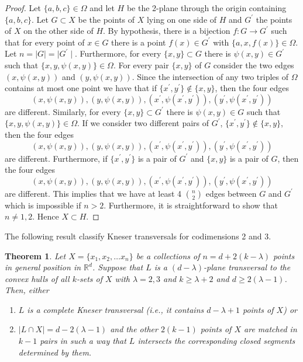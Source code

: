 \documentclass[11pt]{amsart}
\theoremstyle{plain}
\newtheorem{theorem}{Theorem}[section]
\theoremstyle{definition}
\theoremstyle{remark}
\begin{document}
\begin{proof}
Let $\{a,b,c\} \in \Omega$ and let $H$ be the 2-plane through the origin containing $\{a,b,c\}$. Let $G\subset X$ be the points of $X$ lying on one side of $H$ and $G^\prime$ the points of $X$ on the other side of $H$. By hypothesis, there is a bijection $f:G \to G^\prime $ such that for every point of $x\in G$ there is a point $f(x) \in G^\prime$ with $\{a,x,f(x)\}\in \Omega$. Let $n=\mid G\mid =\mid G^\prime\mid$. Furthermore, for every $\{x,y \}\subset G$ there is $\psi(x,y)\in G^\prime$ such that $\{x,y,\psi(x,y) \}\in \Omega$. For every pair  $\{x,y \}$ of $G$ consider the two edges $(x,\psi(x,y) )$ and $(y,\psi(x,y))$. Since the intersection of any two triples of $\Omega$ contains at most one point we have that if  $\{x^\prime,y^\prime \}\notin \{x,y \}$, then the four edges  $$(x,\psi(x,y) ), (y,\psi(x,y)), (x^\prime,\psi(x^\prime,y^\prime) ), (y^\prime,\psi(x^\prime,y^\prime))$$ are different.  Similarly, for every $\{x,y \}\subset G^\prime$ there is $\psi(x,y)\in G$ such that $\{x,y,\psi(x,y) \}\in \Omega$. If we consider two different pairs of $G^\prime$,   $\{x^\prime,y^\prime \}\notin \{x,y \}$, then the four edges  $$(x,\psi(x,y) ), (y,\psi(x,y)), (x^\prime,\psi(x^\prime,y^\prime) ), (y^\prime,\psi(x^\prime,y^\prime))$$ are different. Furthermore, if $\{x^\prime,y^\prime \}$ is a pair of $G^\prime$ and $\{x,y \}$ is a pair of $G$, then the four edges  $$(x,\psi(x,y) ), (y,\psi(x,y)), (x^\prime,\psi(x^\prime,y^\prime) ), (y^\prime,\psi(x^\prime,y^\prime))$$ are different. This implies that we have at least  4 ${ n \choose 2 }$ edges between $G$ and $G^\prime$ which is impossible if $n >2$.  Furthermore, it is straightforward to show that $n \not= 1,2$.  Hence $X\subset H$. 
\end{proof}

The following result classify Kneser transversals for codimensions 2 and 3.

\begin{theorem}\label{th:kt}
Let $X=\{x_1, x_2, \dots x_n\}$  be a collections of $n=d+2(k-\lambda)$ points in general position in $\mathbb{R}^{d}$. Suppose that $L$ is a $(d-\lambda)$-plane transversal to the convex hulls of all $k$-sets of $X$ with $\lambda=2, 3$ and $k{\geqslant} \lambda +2$ and $d{\geqslant} 2(\lambda-1)$.  Then, either 
\begin{enumerate}[1)]
\item
$L$ is a complete Kneser transversal (i.e., it contains $d-\lambda+1$ points of $X$) or  
\item
$\mid L\cap X \mid= d-2(\lambda-1)$ and the other $2(k-1)$ points of $X$ are matched in $k-1$ pairs in such a way that $L$ intersects the corresponding closed segments determined by them.
\end{enumerate}
\end{theorem}
\end{document}
